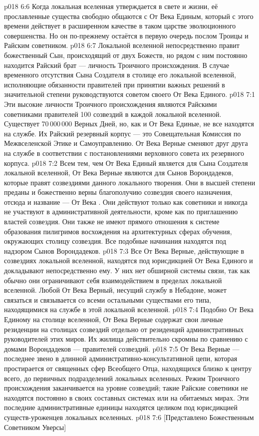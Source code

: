 \vs p018 6:6 Когда локальная вселенная утверждается в свете и жизни, её прославленные существа свободно общаются с От Века Единым, который с этого времени действует в расширенном качестве в таком царстве эволюционного совершенства. Но он по\hyp{}прежнему остаётся в первую очередь послом Троицы и Райским советником.
\vs p018 6:7 Локальной вселенной непосредственно правит божественный Сын, происходящий от двух Божеств, но рядом с ним постоянно находится Райский брат --- личность Троичного происхождения. В случае временного отсутствия Сына Создателя в столице его локальной вселенной, исполняющие обязанности правителей при принятии важных решений в значительной степени руководствуются советом своего От Века Единого.
\vs p018 7:1 Эти высокие личности Троичного происхождения являются Райскими советниками правителей 100 созвездий в каждой локальной вселенной. Существует 70\,000\,000 Верных Дней, но, как и От Века Единые, не все находятся на службе. Их Райский резервный корпус --- это Совещательная Комиссия по Межвселенской Этике и Самоуправлению. От Века Верные сменяют друг друга на службе в соответствии с постановлениями верховного совета их резервного корпуса.
\vs p018 7:2 Всем тем, чем От Века Единый является для Сына Создателя локальной вселенной, От Века Верные являются для Сынов Ворондадеков, которые правят созвездиями данного локального творения. Они в высшей степени преданы и божественно верны благополучию созвездия своего назначения, отсюда и название --- От Века . Они действуют только как советники и никогда не участвуют в административной деятельности, кроме как по приглашению властей созвездия. Они также не имеют прямого отношения к системе образования пилигримов восхождения на архитектурных сферах обучения, окружающих столицу созвездия. Все подобные начинания находятся под надзором Сынов Ворондадеков.
\vs p018 7:3 Все От Века Верные, действующие в созвездиях локальной вселенной, находятся под юрисдикцией От Века Единого и докладывают непосредственно ему. У них нет обширной системы связи, так как обычно они ограничивают себя взаимодействием в пределах локальной вселенной. Любой От Века Верный, несущий службу в Небадоне, может связаться и связывается со всеми остальными существами его типа, находящимися на службе в этой локальной вселенной.
\vs p018 7:4 Подобно От Века Единому на столице вселенной, От Века Верные содержат свои личные резиденции на столицах созвездий отдельно от резиденций административных руководителей этих миров. Их жилища действительно скромны по сравнению с домами Ворондадеков --- правителей созвездий.
\vs p018 7:5 От Века Верные --- последнее звено в длинной административно\hyp{}консультативной цепи, которая простирается от священных сфер Всеобщего Отца, находящихся близко к центру всего, до первичных подразделений локальных вселенных. Режим Троичного происхождения заканчивается на уровне созвездий; такие Райские советники не находятся постоянно в своих составных системах или на обитаемых мирах. Эти последние административные единицы находятся целиком под юрисдикцией существ\hyp{}уроженцев локальных вселенных.
\vsetoff
\vs p018 7:6 [Представлено Божественным Советником Уверсы]
\quizlink
